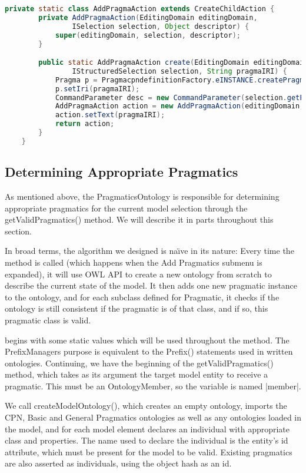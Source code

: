 	\begin{lstlisting}[language=Java,float,label=lst:AddPragmaAction,
	caption=AddPragmaAction]
	private static class AddPragmaAction extends CreateChildAction {
		private AddPragmaAction(EditingDomain editingDomain,
				ISelection selection, Object descriptor) {
			super(editingDomain, selection, descriptor);
		}

		public static AddPragmaAction create(EditingDomain editingDomain,
				IStructuredSelection selection, String pragmaIRI) {
			Pragma p = PragmacpndefinitionFactory.eINSTANCE.createPragma();
			p.setIri(pragmaIRI);
			CommandParameter desc = new CommandParameter(selection.getFirstElement(), PragmacpndefinitionPackage.Literals.ONTOLOGY_MEMBER__ANNOTATION, p);
			AddPragmaAction action = new AddPragmaAction(editingDomain, selection, desc);
			action.setText(pragmaIRI);
			return action;
		}
	}
	\end{lstlisting}
	
	\subsection{Determining Appropriate Pragmatics}\label{sec:cwa}
	
	As mentioned above, the PragmaticsOntology is responsible for determining
	appropriate pragmatics for the current model selection through the
	getValidPragmatics() method. We will describe it in parts throughout this
	section.
	
	In broad terms, the algorithm we designed is na\"{\i}ve in its nature: Every
	time the method is called (which happens when the Add Pragmatics submenu is
	expanded), it will use OWL API to create a new ontology from scratch to
	describe the current state of the model. It then adds one new pragmatic
	instance to the ontology, and for each subclass defined for Pragmatic, it
	checks if the ontology is still consistent if the pragmatic is of that class,
	and if so, this pragmatic class is valid.
	
	 begins with some static values which will be used
	throughout the method. The PrefixManagers purpose is equivalent to the Prefix()
	statements used in written ontologies. Continuing, we have the beginning of the
	getValidPragmatics() method, which takes as its argument the target model
	entity to receive a pragmatic. This must be an OntologyMember, so the variable
	is named |member|.
	
	We call createModelOntology(), which creates an empty ontology, imports the
	CPN, Basic and General Pragmatics ontologies as well as any ontologies loaded
	in the model, and for each model element declares an individual with
	appropriate class and properties. The name used to declare the individual is
	the entity's id attribute, which must be present for the model to be valid.
	Existing pragmatics are also asserted as individuals, using the object hash as
	an id.
	
